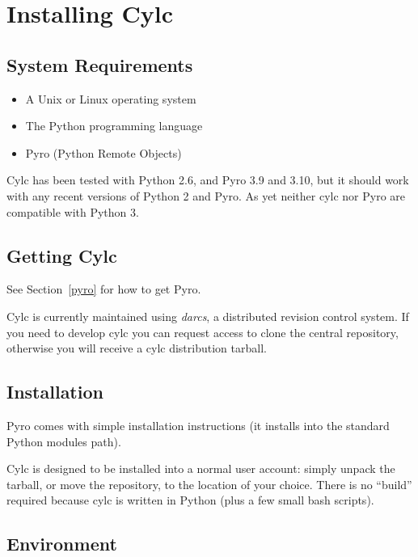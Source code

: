\documentclass[11pt,a4paper]{article}
\begin{document}
\pagebreak
\section{Installing Cylc} 
\label{InstallingCylc}

\subsection{System Requirements} 
\label{SystemRequirements}

\begin{itemize}
    \item A Unix or Linux operating system
    \item The Python programming language
    \item Pyro (Python Remote Objects)
\end{itemize}

Cylc has been tested with Python 2.6, and Pyro 3.9 and 3.10,
but it should work with any recent versions of Python 2 and Pyro.
As yet neither cylc nor Pyro are compatible with Python 3. 

\subsection{Getting Cylc} 
\label{GettingCylc}

See Section~\ref{pyro} for how to get Pyro.

Cylc is currently maintained using {\em darcs}, a distributed revision
control system. If you need to develop cylc you can request access to
clone the central repository, otherwise you will receive a cylc
distribution tarball. 

\subsection{Installation} 
\label{Installation}

Pyro comes with simple installation instructions (it installs into the
standard Python modules path). 

Cylc is designed to be installed into a normal user account: simply
unpack the tarball, or move the repository, to the location of your
choice. There is no ``build'' required because cylc is written in Python
(plus a few small bash scripts).

\subsection{Environment} 
\label{Environment}
\end{document}
